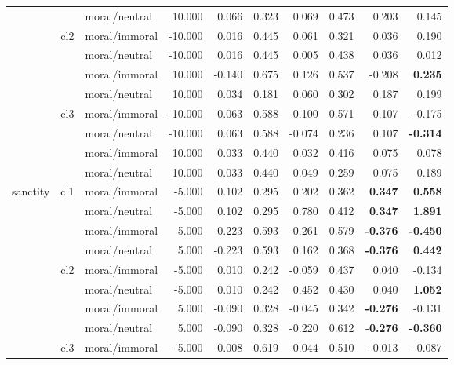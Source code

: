 \documentclass[runninghheads]{llncs}
\begin{document}
\begin{table}[!ht]
\begin{tabular}{|l|l|l|r|r|r|r|r|r|r|}
         &  & moral/neutral & 10.000 & 0.066 & 0.323 & 0.069 & 0.473 & 0.203 & 0.145 \\ 
          \cline{2-10}
         & \multirow{4}{*}{cl2} & moral/immoral & -10.000 & 0.016 & 0.445 & 0.061 & 0.321 & 0.036 & 0.190 \\ 
         &  & moral/neutral & -10.000 & 0.016 & 0.445 & 0.005 & 0.438 & 0.036 & 0.012 \\ 
         &  & moral/immoral & 10.000 & -0.140 & 0.675 & 0.126 & 0.537 & -0.208 & \textbf{0.235} \\ 
         &  & moral/neutral & 10.000 & 0.034 & 0.181 & 0.060 & 0.302 & 0.187 & 0.199 \\ 
          \cline{2-10}
         & \multirow{4}{*}{cl3} & moral/immoral & -10.000 & 0.063 & 0.588 & -0.100 & 0.571 & 0.107 & -0.175 \\ 
         &  & moral/neutral & -10.000 & 0.063 & 0.588 & -0.074 & 0.236 & 0.107 & \textbf{-0.314} \\
         &  & moral/immoral & 10.000 & 0.033 & 0.440 & 0.032 & 0.416 & 0.075 & 0.078 \\ 
         &  & moral/neutral & 10.000 & 0.033 & 0.440 & 0.049 & 0.259 & 0.075 & 0.189 \\ 
        \hline\hline
        \multirow{12}{*}{sanctity} & \multirow{4}{*}{cl1} & moral/immoral & -5.000 & 0.102 & 0.295 & 0.202 & 0.362 & \textbf{0.347} & \textbf{0.558} \\ 
         &  & moral/neutral & -5.000 & 0.102 & 0.295 & 0.780 & 0.412 & \textbf{0.347} & \textbf{1.891} \\ 
         &  & moral/immoral & 5.000 & -0.223 & 0.593 & -0.261 & 0.579 & \textbf{-0.376} & \textbf{-0.450} \\ 
         &  & moral/neutral & 5.000 & -0.223 & 0.593 & 0.162 & 0.368 & \textbf{-0.376} & \textbf{0.442} \\ 
          \cline{2-10}
         & \multirow{4}{*}{cl2} & moral/immoral & -5.000 & 0.010 & 0.242 & -0.059 & 0.437 & 0.040 & -0.134 \\ 
         &  & moral/neutral & -5.000 & 0.010 & 0.242 & 0.452 & 0.430 & 0.040 & \textbf{1.052} \\ 
         &  & moral/immoral & 5.000 & -0.090 & 0.328 & -0.045 & 0.342 & \textbf{-0.276} & -0.131 \\ 
         &  & moral/neutral & 5.000 & -0.090 & 0.328 & -0.220 & 0.612 & -\textbf{0.276} & \textbf{-0.360} \\ 
         \cline{2-10}       
         & \multirow{4}{*}{cl3} & moral/immoral & -5.000 & -0.008 & 0.619 & -0.044 & 0.510 & -0.013 & -0.087 \\ 

\end{tabular}
\end{table}
\end{document}
